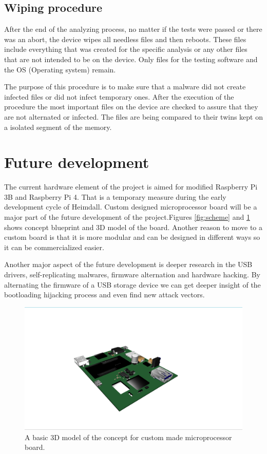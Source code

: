 \documentclass[sigconf]{acmart}
\begin{document}
\subsection{Wiping procedure}
\par \quad After the end of the analyzing process, no matter if the tests were passed or there was an abort, the device wipes all needless files and then reboots. These files include everything that was created for the specific analysis or any other files that are not intended to be on the device. Only files for the testing software and the OS (Operating system) remain.
\par The purpose of this procedure is to make sure that a malware did not create infected files or did not infect temporary ones. After the execution of the procedure the most important files on the device are checked to assure that they are not alternated or infected. The files are being compared to their twins kept on a isolated segment of the memory.

\section{Future development}
\par \quad The current hardware element of the project is aimed for modified Raspberry Pi 3B and Raspberry Pi 4. That is a temporary measure during the early development cycle of Heimdall. Custom designed microprocessor board will be a major part of the future development of the project.Figures \ref{fig:scheme} and \ref{fig:3d_model_concept} shows concept blueprint and 3D model of the board. Another reason to move to a custom board is that it is more modular and can be designed in different ways so it can be commercialized easier.
\par Another major aspect of the future development is deeper research in the USB drivers, self-replicating malwares, firmware alternation and hardware hacking. By alternating the firmware of a USB storage device we can get deeper insight of the bootloading hijacking process and even find new attack vectors.

\begin{figure}[htp]
    \centering
    \includegraphics[width=\linewidth]{images/PCB_screenshot.png}
    \caption{A basic 3D model of the concept for custom made microprocessor board.}
    \label{fig:3d_model_concept}
\end{figure}
\end{document}
